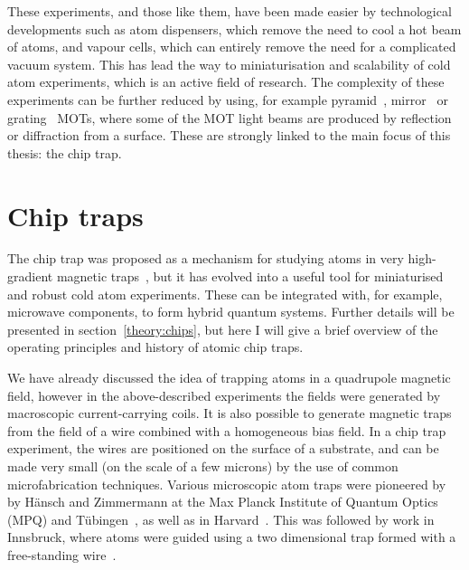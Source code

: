 These experiments, and those like them, have been made easier by technological
developments such as atom dispensers, which remove the need to cool
a hot beam of atoms, and vapour cells, which can entirely remove the
need for a complicated vacuum system. This has lead the way to miniaturisation
and scalability of cold atom experiments, which is an active field of research.
The complexity of these experiments can be further reduced by using, for
example pyramid~\cite{Lee:96}, mirror~\cite{Reichel1999, 4797887} or
grating~\cite{Nshii2013} MOTs, where some of the MOT light beams are produced
by reflection or diffraction from a surface. These are strongly linked to the
main focus of this thesis: the chip trap.

\section{Chip traps}

The chip trap was proposed as a mechanism for studying atoms in very
high-gradient magnetic traps~\cite{PhysRevA.52.4004}, but it has evolved into a
useful tool for miniaturised and robust cold atom experiments. These can be
integrated with, for example, microwave components, to form hybrid quantum
systems. Further details will be presented in section~\ref{theory:chips}, but
here I will give a brief overview of the operating principles and history of
atomic chip traps.

We have already discussed the idea of trapping atoms in a quadrupole magnetic
field, however in the above-described experiments the fields were generated by
macroscopic current-carrying coils. It is also possible to generate magnetic
traps from the field of a wire combined with a homogeneous bias field. In a
chip trap experiment, the wires are positioned on the surface of a substrate,
and can be made very small (on the scale of a few microns) by the use of common
microfabrication techniques. Various microscopic atom traps were pioneered by
by H\"ansch and Zimmermann at the Max Planck Institute of Quantum Optics (MPQ)
and T\"ubingen~\cite{PhysRevLett.80.1634, PhysRevLett.81.5310}, as well as in
Harvard~\cite{Drindic1998}. This was followed by work in Innsbruck, where atoms
were guided using a two dimensional trap formed with a free-standing
wire~\cite{PhysRevLett.82.2014}. 

